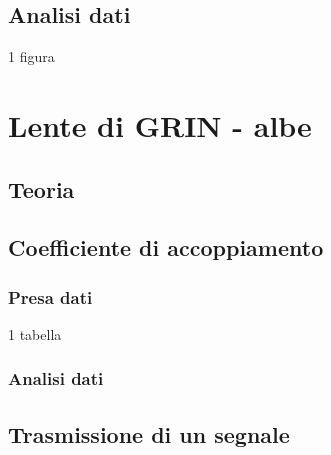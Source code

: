 \documentclass[a4paper]{article}
\begin{document}
\subsection{Analisi dati}

1 figura

\section{Lente di GRIN - albe}

\subsection{Teoria}

\subsection{Coefficiente di accoppiamento}

\subsubsection{Presa dati}

1 tabella

\subsubsection{Analisi dati}

\subsection{Trasmissione di un segnale}
	
\end{document}
